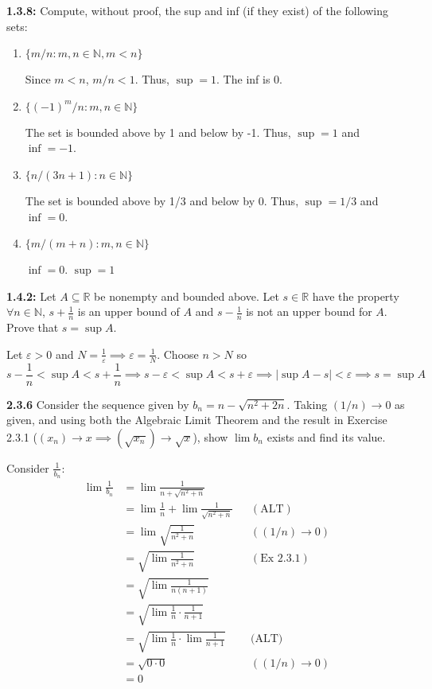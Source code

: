 \documentclass[12pt]{article}
\newcommand{\R}{\mathbb{R}}
\newcommand{\N}{\mathbb{N}}
\newcommand{\abs}[1]{\left\vert #1 \right\vert}
\newcommand{\ep}{\varepsilon}
\begin{document}
\textbf{1.3.8:} Compute, without proof, the sup and inf (if they exist) of the following sets:
\begin{enumerate}
    \item $\{m/n: m,n \in \N, m < n\}$ 

        \color{blue}
            Since $m < n$, $m/n < 1$. Thus, $\sup = 1$. The inf is 0.
        \color{black}

    \item $\{(-1)^m/n: m,n \in \N\}$
    
        \color{blue}
            The set is bounded above by 1 and below by -1. Thus, $\sup = 1$ and $\inf = -1$.
        \color{black}

    \item $\{n/(3n+1): n \in \N\}$ 
            
            \color{blue}
                The set is bounded above by 1/3 and below by 0. Thus, $\sup = 1/3$ and $\inf = 0$.
            \color{black}

    \item $\{m/(m+n): m, n \in \N\}$

        \color{blue}
            $\inf = 0$. $\sup = 1$
        \color{black}
\end{enumerate}

\textbf{1.4.2:} Let $A \subseteq \R$ be nonempty and bounded above. Let $s \in \R$ have the property $\forall n \in \N$, $s + \frac{1}{n}$ is an upper bound of $A$ and $s - \frac{1}{n}$ is not an upper bound for $A$. Prove that $s = \sup A$.

    \color{blue}
        Let $\ep > 0$ and $N = \frac{1}{\ep} \implies \ep = \frac{1}{N}$. Choose $n > N$ so 
        \[s - \frac{1}{n} < \sup A < s + \frac{1}{n} \implies s - \ep < \sup A < s + \ep \implies \abs{\sup A - s} < \ep \implies s = \sup A\]
    \color{black}

\textbf{2.3.6} Consider the sequence given by $b_n = n - \sqrt{n^2 + 2n}$. Taking $(1/n) \to 0$ as given, and using both the Algebraic Limit Theorem and the result in Exercise 2.3.1 ($(x_n)\to x \implies (\sqrt{x_n})\to \sqrt{x}$), show $\lim b_n$ exists and find its value.

    \color{blue}
        Consider $\frac{1}{b_n}$: 
        \begin{align*}
            \lim \frac{1}{b_n} &= \lim \frac{1}{n + \sqrt{n^2 + n}}\\ 
                &= \lim \frac{1}{n} + \lim \frac{1}{\sqrt{n^2 + n}} && (\text{ALT})\\ 
                &= \lim \sqrt{\frac{1}{n^2 + n}} && ((1/n) \to 0)\\ 
                &= \sqrt{\lim \frac{1}{n^2 + n}} && (\text{Ex 2.3.1})\\
                &= \sqrt{\lim \frac{1}{n(n + 1)}}\\ 
                &= \sqrt{\lim \frac{1}{n} \cdot \frac{1}{n + 1}}\\ 
                &= \sqrt{\lim \frac{1}{n} \cdot \lim \frac{1}{n+1}} && \text{(ALT)}\\ 
                &= \sqrt{0 \cdot 0} && ((1/n) \to 0)\\ 
                &= 0 
        \end{align*}
\end{document}
